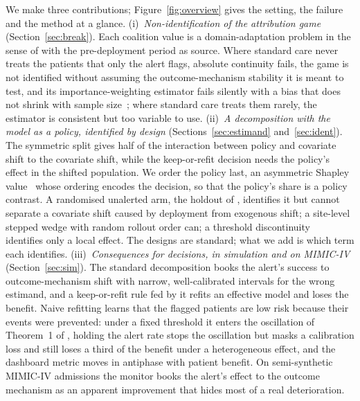 \documentclass[letterpaper]{article} %
\begin{document}
We make three contributions; Figure~\ref{fig:overview} gives the setting,
the failure and the method at a glance.
(i)~\emph{Non-identification of the attribution game} (Section~\ref{sec:break}).
Each coalition value is a domain-adaptation problem in the sense of
\citet{boeken2024evaluating} with the pre-deployment period as source. Where
standard care never treats the patients that only the alert flags, absolute
continuity fails, the game is not identified without assuming the
outcome-mechanism stability it is meant to test, and its importance-weighting
estimator fails silently with a bias that does not shrink with sample
size~\citep{petersen2012positivity}; where standard care treats them rarely,
the estimator is consistent but too variable to use.
(ii)~\emph{A decomposition with the model as a policy, identified by design}
(Sections~\ref{sec:estimand} and~\ref{sec:ident}). The symmetric split gives
half of the interaction between policy and covariate shift to the covariate
shift, while the keep-or-refit decision needs the policy's effect in the
shifted population. We order the policy last, an asymmetric Shapley
value~\citep{frye2020asymmetric} whose ordering encodes the decision, so that
the policy's share is a policy contrast. A randomised unalerted arm, the
holdout of \citet{liley2021model}, identifies it but cannot separate a
covariate shift caused by deployment from exogenous shift; a site-level stepped
wedge with random rollout order can; a threshold
discontinuity~\citep{gallo2024effectiveness} identifies only a local effect.
The designs are standard; what we add is which term each identifies.
(iii)~\emph{Consequences for decisions, in simulation and on MIMIC-IV}
(Section~\ref{sec:sim}). The standard decomposition books the alert's success
to outcome-mechanism shift with narrow, well-calibrated intervals for the wrong
estimand, and a keep-or-refit rule fed by it refits an effective model and
loses the benefit. Naive refitting learns that the flagged patients are low
risk because their events were prevented: under a fixed threshold it enters
the oscillation of Theorem~1 of \citet{liley2021model}, holding the alert rate
stops the oscillation but masks a calibration loss and still loses a third of
the benefit under a heterogeneous effect, and the dashboard metric moves in
antiphase with patient benefit. On semi-synthetic MIMIC-IV admissions
the monitor books the alert's effect to the outcome mechanism as an apparent
improvement that hides most of a real deterioration.

\end{document}
